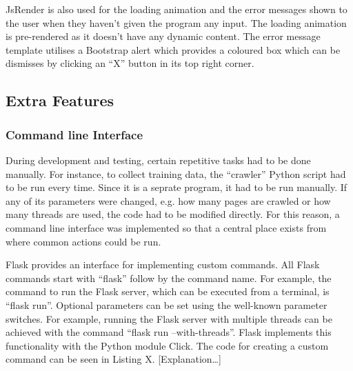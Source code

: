 \documentclass[12pt,a4paper]{article}
\begin{document}
JsRender is also used for the loading animation and the error messages shown to the user when they haven’t given the program any input. The loading animation is pre-rendered as it doesn’t have any dynamic content. The error message template utilises a Bootstrap alert which provides a coloured box which can be dismisses by clicking an “X” button in its top right corner. 

\subsection{Extra Features}
\subsubsection{Command line Interface}
During development and testing, certain repetitive tasks had to be done manually. For instance, to collect training data, the “crawler” Python script had to be run every time. Since it is a seprate program, it had to be run manually. If any of its parameters were changed, e.g. how many pages are crawled or how many threads are used, the code had to be modified directly. For this reason, a command line interface was implemented so that a central place exists from where common actions could be run. 

Flask provides an interface for implementing custom commands. All Flask commands start with “flask” follow by the command name. For example, the command to run the Flask server, which can be executed from a terminal, is “flask run”. Optional parameters can be set using the well-known parameter switches. For example, running the Flask server with multiple threads can be achieved with the command “flask run --with-threads”. Flask implements this functionality with the Python module Click. The code for creating a custom command can be seen in Listing X. [Explanation…]
\end{document}
